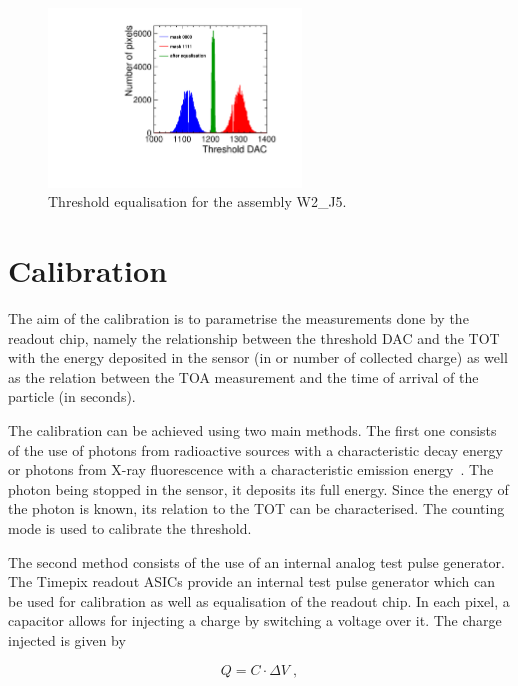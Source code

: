 \begin{figure}[htbp] 
  \centering
  \includegraphics[width=0.6\textwidth]{./figures/Calibration/THLequalisation_W2_J5.pdf}
  \caption{Threshold equalisation for the assembly W2\_J5.}
  \label{fig:THLequalisation}
\end{figure}

\section{Calibration} \label{sec:calibration} The aim of the
calibration is to parametrise the measurements done by the readout
chip, namely the relationship between the threshold DAC and the TOT
with the energy deposited in the sensor (in \kev or number of
collected charge) as well as the relation between the TOA measurement
and the time of arrival of the particle (in seconds).

The calibration can be achieved using two main methods. The first one
consists of the use of photons from radioactive sources with a
characteristic decay energy or photons from X-ray fluorescence with a
characteristic emission energy~\cite{AlipourTehrani:2054922}. The
photon being stopped in the sensor, it deposits its full energy. Since
the energy of the photon is known, its relation to the TOT can be
characterised. The counting mode is used to calibrate the threshold.

The second method consists of the use of an internal analog test pulse
generator. The Timepix readout ASICs provide an internal test pulse
generator which can be used for calibration as well as equalisation of
the readout chip. In each pixel, a capacitor allows for injecting a
charge by switching a voltage over it. The charge injected is given by

\begin{equation}
  Q = C \cdot \Delta V \; ,
  \label{eq:testpulseCharge}
\end{equation}

